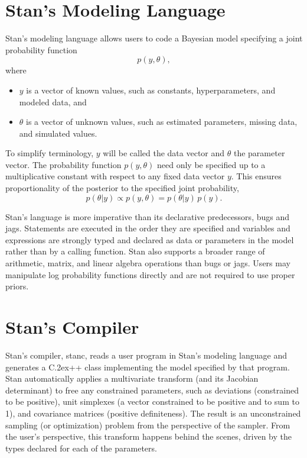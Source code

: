 \documentclass[10pt]{report}
\newcommand{\Stan}{Stan\xspace}
\newcommand{\stanc}{{\ttfamily stanc}\xspace}
\newcommand*{\Cpp}{C\raise.2ex\hbox{\footnotesize ++}\xspace} %
\newcommand{\acronym}[1]{{\sc #1}\xspace}
\newcommand{\BUGS}{\acronym{bugs}}
\newcommand{\JAGS}{\acronym{jags}}
\begin{document}
\section{\Stan's Modeling Language}

\noindent
\Stan's modeling language allows users to code a Bayesian model
specifying a joint probability function
\[
p(y,\theta),
\]
where 
\begin{itemize}
\item
  $y$ is a vector of known values, such as 
  constants, hyperparameters, and modeled data, and
\item
 $\theta$ is a vector of unknown values, such as estimated parameters,
  missing data, and simulated values.
\end{itemize}
%
To simplify terminology, $y$ will be called the data vector and
$\theta$ the parameter vector.  The probability function $p(y,\theta)$
need only be specified up to a multiplicative constant with respect to
any fixed data vector $y$.  This ensures proportionality of the
posterior to the specified joint probability,
\[
p(\theta|y) \propto p(y,\theta) = p(\theta|y) \, p(y).
\]

Stan's language is more imperative than its declarative 
predecessors, \BUGS and \JAGS.  Statements are executed in the order 
they are specified and variables and expressions are strongly typed 
and declared as data or parameters in the model rather than by a 
calling function.  \Stan also supports a broader range of arithmetic, 
matrix, and linear algebra operations than \BUGS or \JAGS.  Users may 
manipulate log probability functions directly and are not required 
to use proper priors.

\section{\Stan's Compiler}

\Stan's compiler, \stanc, reads a user program in \Stan's modeling
language and generates a \Cpp class implementing the model specified
by that program.  \Stan automatically applies a multivariate transform
(and its Jacobian determinant) to free any constrained parameters,
such as deviations (constrained to be positive), unit simplexes (a vector
constrained to be positive and to sum to 1), and covariance matrices
(positive definiteness).  The result is an unconstrained sampling (or
optimization) problem from the perspective of the sampler.  From the
user's perspective, this transform happens behind the scenes, driven
by the types declared for each of the parameters.
\end{document}
